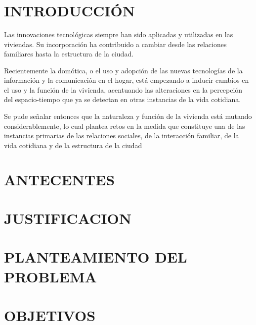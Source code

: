 \documentclass[letterpaper,12pt]{article}
\begin{document}
{\begin{center}
\begin{minipage}[b]{5cm}
	\end{minipage}\\
	[4cm]

	{\fontsize{12}{3}\selectfont{Cochabamba, 2018}}\\[1cm]
\end{center}



\vspace{1cm}
\ %



\tableofcontents
\newpage



\section{INTRODUCCIÓN}
\vspace{1.5cm}

Las innovaciones tecnológicas siempre han sido aplicadas y utilizadas en las viviendas. Su incorporación ha contribuido a cambiar desde las relaciones familiares hasta la estructura de la ciudad.
 
Recientemente la domótica, o el uso y adopción de las nuevas tecnologías de la información y la comunicación en el hogar, está empezando a inducir cambios en el uso y la función de la vivienda, acentuando las alteraciones en la percepción del espacio-tiempo que ya se detectan en otras instancias de la vida cotidiana. 
 
 Se pude señalar entonces que la naturaleza y función de la vivienda está mutando considerablemente, lo cual plantea retos en la medida que constituye una de las instancias primarias de las relaciones sociales, de la interacción familiar, de la vida cotidiana y de la estructura de la ciudad



\section{ANTECENTES}
\section{JUSTIFICACION}
\section{PLANTEAMIENTO DEL PROBLEMA}
\section{OBJETIVOS}
}
\end{document}
